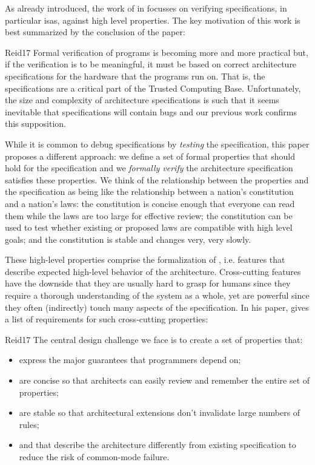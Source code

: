 As already introduced, the work of \citeauthor{Reid17} in  \cite{Reid17} focusses on verifying specifications, in particular \glspl{isa}, against high level properties.
The key motivation of this work is best summarized by the conclusion of the paper:
\begin{displaycquote}[p.88:22]{Reid17}
    Formal verification of programs is becoming more and more practical but, if the verification is to be meaningful, it must be based on correct architecture specifications for the hardware that the programs run on.
    That is, the specifications are a critical part of the Trusted Computing Base.
    Unfortunately, the size and complexity of architecture specifications is such that it seems inevitable that specifications will contain bugs and our previous work confirms this supposition.

    While it is common to debug specifications by \textit{testing} the specification, this paper proposes a different approach:
    we define a set of formal properties that should hold for the specification and we \textit{formally verify} the architecture specification satisfies these properties.
    We think of the relationship between the properties and the specification as being like the relationship between a nation's constitution and a nation's laws:
    the constitution is concise enough that everyone can read them while the laws are too large for effective review; the constitution can be used to test whether existing or proposed laws are compatible with high level goals; and the constitution is stable and changes very, very slowly.
\end{displaycquote}

These high-level properties comprise the formalization of , i.e. features that describe expected high-level behavior of the architecture.
Cross-cutting features have the downside that they are usually hard to grasp for humans since they require a thorough understanding of the system as a whole, yet are powerful since they often (indirectly) touch many aspects of the specification.
In his paper, \citeauthor{Reid17} gives a list of requirements for such cross-cutting properties:
\begin{displaycquote}[pp.88:2-3]{Reid17}
    The central design challenge we face is to create a set of properties that:
    \begin{itemize}
        \item express the major guarantees that programmers depend on;
        \item are concise so that architects can easily review and remember the entire set of properties;
        \item are stable so that architectural extensions don't invalidate large numbers of rules;
        \item and that describe the architecture differently from existing specification to reduce the risk of common-mode failure.
    \end{itemize}
\end{displaycquote}

